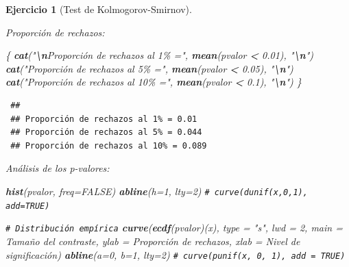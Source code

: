 \documentclass[
  spanish,
  10pt,
]{book}
\newenvironment{Shaded}{\begin{snugshade}}{\end{snugshade}}
\newcommand{\AttributeTok}[1]{\textcolor[rgb]{0.13,0.29,0.53}{#1}}
\newcommand{\CommentTok}[1]{\textcolor[rgb]{0.56,0.35,0.01}{\textit{#1}}}
\newcommand{\ConstantTok}[1]{\textcolor[rgb]{0.56,0.35,0.01}{#1}}
\newcommand{\DecValTok}[1]{\textcolor[rgb]{0.00,0.00,0.81}{#1}}
\newcommand{\FloatTok}[1]{\textcolor[rgb]{0.00,0.00,0.81}{#1}}
\newcommand{\FunctionTok}[1]{\textcolor[rgb]{0.13,0.29,0.53}{\textbf{#1}}}
\newcommand{\NormalTok}[1]{#1}
\newcommand{\SpecialCharTok}[1]{\textcolor[rgb]{0.81,0.36,0.00}{\textbf{#1}}}
\newcommand{\StringTok}[1]{\textcolor[rgb]{0.31,0.60,0.02}{#1}}
\theoremstyle{break}
\newtheorem{exercise}{Ejercicio}[chapter]
\theoremstyle{nonumberplain}
\renewcommand{\CommentTok}[1]{\textcolor[rgb]{0.41,0.41,0.41}{\texttt{#1}}}
\begin{document}
\begin{exercise}[Test de Kolmogorov-Smirnov]
\begin{enumerate}
  Proporción de rechazos:

\begin{Shaded}
\begin{Highlighting}[]
\NormalTok{\{}
  \FunctionTok{cat}\NormalTok{(}\StringTok{"}\SpecialCharTok{\textbackslash{}n}\StringTok{Proporción de rechazos al 1\% ="}\NormalTok{, }\FunctionTok{mean}\NormalTok{(pvalor }\SpecialCharTok{\textless{}} \FloatTok{0.01}\NormalTok{), }\StringTok{"}\SpecialCharTok{\textbackslash{}n}\StringTok{"}\NormalTok{)}
  \FunctionTok{cat}\NormalTok{(}\StringTok{"Proporción de rechazos al 5\% ="}\NormalTok{, }\FunctionTok{mean}\NormalTok{(pvalor }\SpecialCharTok{\textless{}} \FloatTok{0.05}\NormalTok{), }\StringTok{"}\SpecialCharTok{\textbackslash{}n}\StringTok{"}\NormalTok{)}
  \FunctionTok{cat}\NormalTok{(}\StringTok{"Proporción de rechazos al 10\% ="}\NormalTok{, }\FunctionTok{mean}\NormalTok{(pvalor }\SpecialCharTok{\textless{}} \FloatTok{0.1}\NormalTok{), }\StringTok{"}\SpecialCharTok{\textbackslash{}n}\StringTok{"}\NormalTok{)}
\NormalTok{\}}
\end{Highlighting}
\end{Shaded}

\begin{verbatim}
 ## 
 ## Proporción de rechazos al 1% = 0.01 
 ## Proporción de rechazos al 5% = 0.044 
 ## Proporción de rechazos al 10% = 0.089
\end{verbatim}

  Análisis de los p-valores:

\begin{Shaded}
\begin{Highlighting}[]
\FunctionTok{hist}\NormalTok{(pvalor, }\AttributeTok{freq=}\ConstantTok{FALSE}\NormalTok{)}
\FunctionTok{abline}\NormalTok{(}\AttributeTok{h=}\DecValTok{1}\NormalTok{, }\AttributeTok{lty=}\DecValTok{2}\NormalTok{)   }\CommentTok{\# curve(dunif(x,0,1), add=TRUE)}

\CommentTok{\# Distribución empírica}
\FunctionTok{curve}\NormalTok{(}\FunctionTok{ecdf}\NormalTok{(pvalor)(x), }\AttributeTok{type =} \StringTok{"s"}\NormalTok{, }\AttributeTok{lwd =} \DecValTok{2}\NormalTok{, }\AttributeTok{main =} \StringTok{\textquotesingle{}Tamaño del contraste\textquotesingle{}}\NormalTok{, }
      \AttributeTok{ylab =} \StringTok{\textquotesingle{}Proporción de rechazos\textquotesingle{}}\NormalTok{, }\AttributeTok{xlab =} \StringTok{\textquotesingle{}Nivel de significación\textquotesingle{}}\NormalTok{)}
\FunctionTok{abline}\NormalTok{(}\AttributeTok{a=}\DecValTok{0}\NormalTok{, }\AttributeTok{b=}\DecValTok{1}\NormalTok{, }\AttributeTok{lty=}\DecValTok{2}\NormalTok{)   }\CommentTok{\# curve(punif(x, 0, 1), add = TRUE)}
\end{Highlighting}
\end{Shaded}


\end{enumerate}
\end{exercise}
\end{document}
